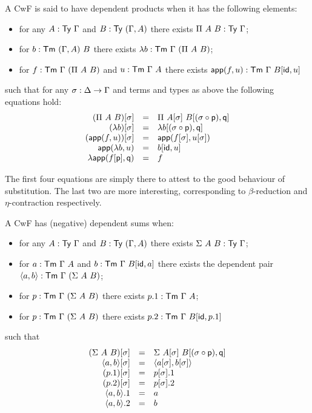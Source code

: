 A \acrshort{CwF} is said to have dependent products when it has the following
elements:
\begin{itemize}
  \item for any \(A : \mathsf{Ty}\ \Gamma\) and \(B : \mathsf{Ty}\ (\Gamma, A)\) there exists
  \(\Pi\ A\ B : \mathsf{Ty}\ \Gamma\);
  \item for \(b : \mathsf{Tm}\ (\Gamma, A)\ B\) there exists
  \(\lambda b : \CTm\ \Ga\ (\Pi\ A\ B)\);
  \item for \(f : \mathsf{Tm}\ \Gamma\ (\Pi\ A\ B)\) and \(u : \mathsf{Tm}\ \Gamma\ A\) there exists
  \(\mathsf{app}(f,u) : \mathsf{Tm}\ \Gamma\ B[\mathsf{id}, u]\)
\end{itemize}
such that for any \(\sigma : \Delta \to \Gamma\) and terms and types as above the
following equations hold:
\[
  \begin{array}{rcl}
    (\Pi\ A\ B)[\sigma] &=& \Pi\ A[\sigma]\ B[(\sigma \circ \mathsf{p}), \mathsf{q}] \\
    (\lambda b)[\sigma] &=& \lambda b[(\sigma \circ \mathsf{p}), \mathsf{q}] \\
    (\mathsf{app}(f,u))[\sigma] &=& \mathsf{app}(f[\sigma],u[\sigma]) \\
    \mathsf{app}(\lambda b, u) &=& b[\mathsf{id}, u] \\
    \lambda \mathsf{app}(f[\mathsf{p}], \mathsf{q}) &=& f
  \end{array}
\]

The first four equations are simply there to attest to the good behaviour of
substitution. The last two are more interesting, corresponding to
\(\beta\)-reduction and \(\eta\)-contraction respectively.


A \acrshort{CwF} has (negative) dependent sums
when:
\begin{itemize}
  \item for any \(A : \mathsf{Ty}\ \Gamma\) and \(B : \mathsf{Ty}\ (\Gamma, A)\) there exists
  \(\Sigma\ A\ B : \mathsf{Ty}\ \Gamma\);
  \item for \(a : \mathsf{Tm}\ \Gamma\ A\) and \(b : \mathsf{Tm}\ \Gamma\ B[\mathsf{id},a]\) there exists
  the dependent pair \(\dpair{a,b} : \CTm\ \Ga\ (\Sigma\ A\ B)\);
  \item for \(p : \CTm\ \Ga\ (\Sigma\ A\ B)\) there exists
  \(p.1 : \CTm\ \Ga\ A\);
  \item for \(p : \CTm\ \Ga\ (\Sigma\ A\ B)\) there exists
  \(p.2 : \CTm\ \Ga\ B[\cid, p.1]\)
\end{itemize}
such that
\[
  \begin{array}{rcl}
    (\Sigma\ A\ B)[\sigma] &=& \Sigma\ A[\sigma]\ B[(\sigma \circ \mathsf{p}), \mathsf{q}] \\
    \langle a,b \rangle[\sigma] &=& \langle a[\sigma], b[\sigma] \rangle \\
    (p.1)[\sigma] &=& p[\sigma].1 \\
    (p.2)[\sigma] &=& p[\sigma].2 \\
    \langle a,b \rangle.1 &=& a \\
    \langle a,b \rangle.2 &=& b
  \end{array}
\]

